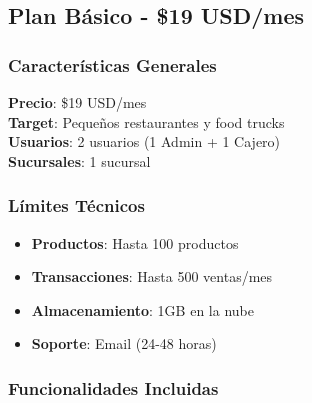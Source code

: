 \documentclass[12pt,a4paper]{article}
\begin{document}
\subsection{Plan Básico - \$19 USD/mes}

\subsubsection{Características Generales}

\begin{tcolorbox}[colback=secondarygreen!10, colframe=secondarygreen, title=Plan Básico]
    \textbf{Precio}: \$19 USD/mes\\
    \textbf{Target}: Pequeños restaurantes y food trucks\\
    \textbf{Usuarios}: 2 usuarios (1 Admin + 1 Cajero)\\
    \textbf{Sucursales}: 1 sucursal
\end{tcolorbox}

\subsubsection{Límites Técnicos}

\begin{itemize}
    \item \textbf{Productos}: Hasta 100 productos
    \item \textbf{Transacciones}: Hasta 500 ventas/mes
    \item \textbf{Almacenamiento}: 1GB en la nube
    \item \textbf{Soporte}: Email (24-48 horas)
\end{itemize}

\subsubsection{Funcionalidades Incluidas}
\end{document}
